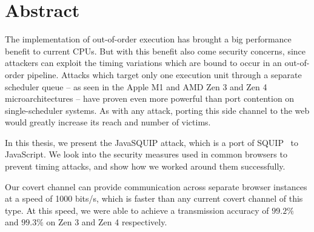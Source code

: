 \documentclass[11pt,
  titlepage=false,
]{scrreprt}
\begin{document}







\printthesistitle

\chapter*{\centering\Large Abstract}
\label{ch:abstract}
The implementation of out-of-order execution has brought a big performance benefit to current CPUs.
But with this benefit also come security concerns, since attackers can exploit the timing variations which are bound to occur in an out-of-order pipeline.
Attacks which target only one execution unit through a separate scheduler queue -- as seen in the Apple M1 and AMD Zen 3 and Zen 4 microarchitectures -- have proven even more powerful than port contention on single-scheduler systems.
As with any attack, porting this side channel to the web would greatly increase its reach and number of victims.

In this thesis, we present the JavaSQUIP attack, which is a port of SQUIP~\cite{squip} to JavaScript.
We look into the security measures used in common browsers to prevent timing attacks, and show how we worked around them successfully.

Our covert channel can provide communication across separate browser instances at a speed of 1000 bits/s,
which is faster than any current covert channel of this type.
At this speed, we were able to achieve a transmission accuracy of $99.2\%$ and $99.3\%$ on Zen 3 and Zen 4 respectively.
\end{document}
